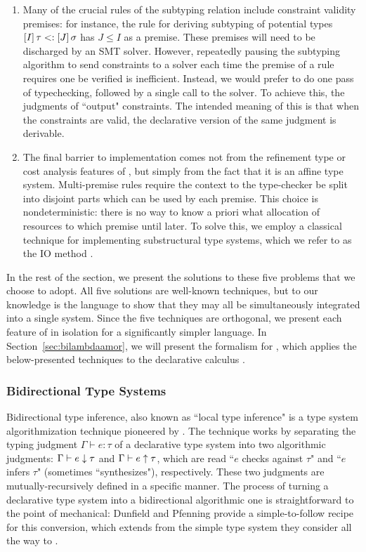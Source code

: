 \begin{enumerate}
  \item Many of the crucial rules of the \dlambdaamor subtyping relation include constraint validity premises: for instance, the rule for deriving subtyping of potential types $[I] \, \tau <: [J] \, \sigma$ has $J \leq I$ as a premise. These premises will need to be discharged by an SMT solver. However, repeatedly pausing the subtyping algorithm to send constraints to a solver each time the premise of a rule requires one be verified is inefficient. Instead, we would prefer to do one pass of typechecking, followed by a single call to the solver. To achieve this, the judgments of \bilambdaamor ``output" constraints. The intended meaning of this is that when the constraints are valid, the declarative version of the same judgment is derivable.
  
  \item The final barrier to implementation comes not from the refinement type or cost analysis features of \dlambdaamor, but simply from the fact that it is an affine type system. Multi-premise rules require the context to the type-checker be split into disjoint parts which can be used by each premise. This choice is nondeterministic: there is no way to know a priori what allocation of resources to which premise until later. To solve this, we employ a classical technique for implementing substructural type systems, which we refer to as the IO method \cite{cervesato:tcs00}.

\end{enumerate}

In the rest of the section, we present the solutions to these five problems that we choose to adopt. All five solutions are well-known techniques, but to our knowledge \bilambdaamor is the language to show that they may all be simultaneously integrated into a single system. Since the five techniques are orthogonal, we present each feature of \bilambdaamor in isolation for a significantly simpler language. In Section~\ref{sec:bilambdaamor}, we will present the formalism for \bilambdaamor, which applies the below-presented techniques to the declarative calculus \dlambdaamor.

\subsubsection{Bidirectional Type Systems}
\label{sec:bilambdaamor-overview-bidir}
Bidirectional type inference, also known as ``local type inference" is a type system algorithmization technique pioneered by \citet{pierce-and-turner:lti}. The technique works by separating the typing judgment $\Gamma \vdash e : \tau$ of a declarative type system into two algorithmic judgments: $\Gamma \vdash e \downarrow \tau$ and $\Gamma \vdash e \uparrow  \tau$, which are read ``$e$ checks against $\tau$" and ``$e$ infers $\tau$" (sometimes ``synthesizes"), respectively. These two judgments are mutually-recursively defined in a specific manner. The process of turning a declarative type system into a bidirectional algorithmic one is straightforward to the point of mechanical: Dunfield and Pfenning \cite{dunfield:popl04} provide a simple-to-follow recipe for this conversion, which extends from the simple type system they consider all the way to \dlambdaamor. 


